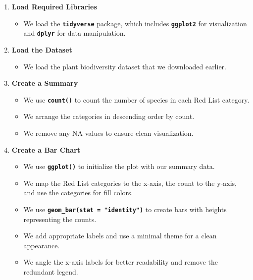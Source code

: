 \documentclass[
  letterpaper,
]{book}
\providecommand{\tightlist}{%
  \setlength{\itemsep}{0pt}\setlength{\parskip}{0pt}}
\begin{document}
\begin{enumerate}
\def\labelenumi{\arabic{enumi}.}
\tightlist
\item
  \textbf{Load Required Libraries}

  \begin{itemize}
  \tightlist
  \item
    We load the \textbf{\texttt{tidyverse}} package, which includes
    \textbf{\texttt{ggplot2}} for visualization and
    \textbf{\texttt{dplyr}} for data manipulation.
  \end{itemize}
\item
  \textbf{Load the Dataset}

  \begin{itemize}
  \tightlist
  \item
    We load the plant biodiversity dataset that we downloaded earlier.
  \end{itemize}
\item
  \textbf{Create a Summary}

  \begin{itemize}
  \tightlist
  \item
    We use \textbf{\texttt{count()}} to count the number of species in
    each Red List category.
  \item
    We arrange the categories in descending order by count.
  \item
    We remove any NA values to ensure clean visualization.
  \end{itemize}
\item
  \textbf{Create a Bar Chart}

  \begin{itemize}
  \tightlist
  \item
    We use \textbf{\texttt{ggplot()}} to initialize the plot with our
    summary data.
  \item
    We map the Red List categories to the x-axis, the count to the
    y-axis, and use the categories for fill colors.
  \item
    We use \textbf{\texttt{geom\_bar(stat\ =\ "identity")}} to create
    bars with heights representing the counts.
  \item
    We add appropriate labels and use a minimal theme for a clean
    appearance.
  \item
    We angle the x-axis labels for better readability and remove the
    redundant legend.
  \end{itemize}
\end{enumerate}
\end{document}
